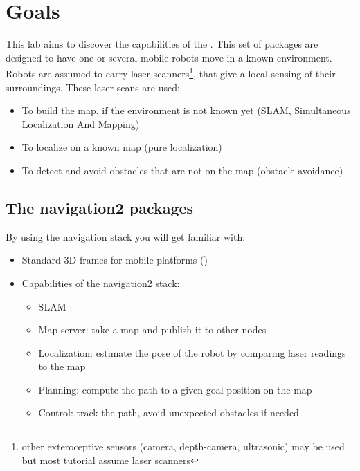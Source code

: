 \documentclass{ecnreport}
\author{O. Kermorgant}
\begin{document}


\section{Goals}

This lab aims to discover the capabilities of the . This set of packages are designed to have one or several mobile robots move in a known environment. Robots are assumed to carry laser scanners\footnote{other exteroceptive sensors (camera, depth-camera, ultrasonic) may be used but most tutorial assume laser scanners}, that give a local sensing of their surroundings. 
These laser scans are used:
\begin{itemize}
 \item To build the map, if the environment is not known yet (SLAM, Simultaneous Localization And Mapping)
 \item To localize on a known map (pure localization)
 \item To detect and avoid obstacles that are not on the map (obstacle avoidance)
 \end{itemize}
 
\subsection{The navigation2 packages}
 
By using the navigation stack you will get familiar with:
\begin{itemize}
 \item Standard 3D frames for mobile platforms ()
 \item Capabilities of the navigation2 stack:
 \begin{itemize}
  \item SLAM
  \item Map server: take a map and publish it to other nodes
  \item Localization: estimate the pose of the robot by comparing laser readings to the map
  \item Planning: compute the path to a given goal position on the map
  \item Control: track the path, avoid unexpected obstacles if needed
 \end{itemize}
\end{itemize}
\end{document}
